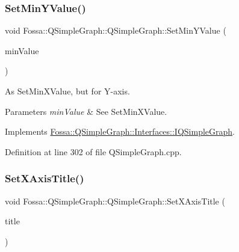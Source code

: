 \subsubsection{\texorpdfstring{Set\+Min\+Y\+Value()}{SetMinYValue()}}
{\footnotesize\ttfamily void Fossa\+::\+Q\+Simple\+Graph\+::\+Q\+Simple\+Graph\+::\+Set\+Min\+Y\+Value (\begin{DoxyParamCaption}\item[{double}]{min\+Value }\end{DoxyParamCaption})\hspace{0.3cm}{\ttfamily [virtual]}}



As Set\+Min\+X\+Value, but for Y-\/axis. 


\begin{DoxyParams}{Parameters}
{\em min\+Value} & See Set\+Min\+X\+Value. \\
\hline
\end{DoxyParams}


Implements \hyperlink{class_fossa_1_1_q_simple_graph_1_1_interfaces_1_1_i_q_simple_graph_a3fdd1f6b538e2dfbf4a0140acd6b6e94}{Fossa\+::\+Q\+Simple\+Graph\+::\+Interfaces\+::\+I\+Q\+Simple\+Graph}.



Definition at line 302 of file Q\+Simple\+Graph.\+cpp.

\mbox{\label{class_fossa_1_1_q_simple_graph_1_1_q_simple_graph_a7579da572b54d43ccec3d2bd572b6cfa}} 
\subsubsection{\texorpdfstring{Set\+X\+Axis\+Title()}{SetXAxisTitle()}}
{\footnotesize\ttfamily void Fossa\+::\+Q\+Simple\+Graph\+::\+Q\+Simple\+Graph\+::\+Set\+X\+Axis\+Title (\begin{DoxyParamCaption}\item[{Q\+String}]{title }\end{DoxyParamCaption})\hspace{0.3cm}{\ttfamily [virtual]}}



